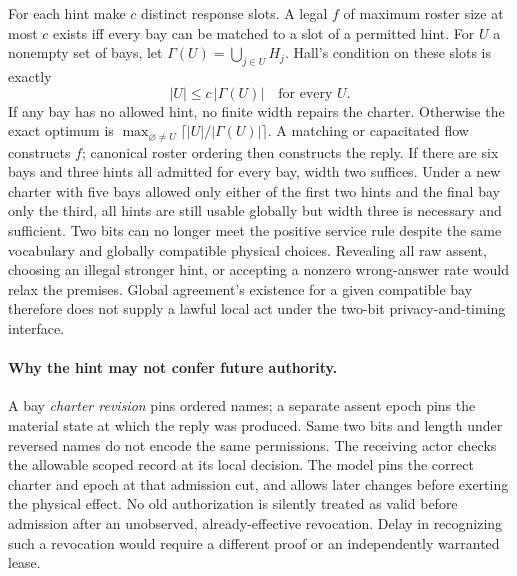 \documentclass{article}
\begin{document}
For each hint make \(c\) distinct response slots. A legal \(f\) of
maximum roster size at most \(c\) exists iff every bay can be matched
to a slot of a permitted hint. For \(U\) a nonempty set of bays,
let \(\Gamma(U)=\bigcup_{j\in U}H_j\).
Hall's condition on these slots is exactly
\[
 |U|\le c\,|\Gamma(U)| \quad\text{for every }U.
\]
If any bay has no allowed hint, no finite width repairs the charter.
Otherwise the exact optimum is
\(\max_{\varnothing\ne U}\lceil |U|/|\Gamma(U)|\rceil\).
A matching or capacitated flow constructs \(f\); canonical roster
ordering then constructs the reply. If there are six bays and three
hints all admitted for every bay, width two suffices. Under a new
charter with five bays allowed only either of the first two hints and
the final bay only the third, all hints are still usable globally
but width three is necessary and sufficient. Two bits can no longer
meet the positive service rule despite the same vocabulary and
globally compatible physical choices. Revealing all raw assent,
choosing an illegal stronger hint, or accepting a nonzero wrong-answer
rate would relax the premises. Global agreement's existence for a
given compatible bay therefore does not supply a lawful local act
under the two-bit privacy-and-timing interface.

\paragraph{Why the hint may not confer future authority.}
A bay \emph{charter revision} pins ordered names; a separate assent
epoch pins the material state at which the reply was produced.
Same two bits and length under reversed names do not encode the same
permissions. The receiving actor checks the allowable scoped record
at its local decision. The model pins the correct charter and epoch at
that admission cut, and allows later changes before exerting the
physical effect. No old authorization is silently treated as valid
before admission after an unobserved, already-effective revocation.
Delay in recognizing such a revocation would require a different
proof or an independently warranted lease.
\end{document}
